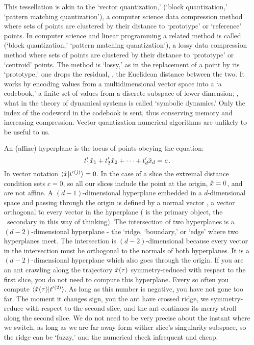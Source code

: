 \begin{description}
 This tessellation is akin to the
{`vector quantization,'} (`block quantization,'  `pattern matching quantization'),
a computer science data compression method where sets of points are
clustered by their distance to `prototype' or `reference' points.
In computer science and linear programming a related method
is called 
(`block quantization,' `pattern matching
quantization'), a lossy data compression method where sets of points are
clustered by their distance to `prototype' or `centroid' points.
The
method is `lossy,' as in the replacement of a point by its `prototype,'
one drops the residual, \ie, the Euclidean distance between the two. It
works by encoding values from a multidimensional vector space into a `a
codebook,' a finite set of values from a discrete subspace of lower
dimension; \ie, what in the theory of dynamical systems is called
`symbolic dynamics.' Only the index of the codeword in the codebook is sent, thus
conserving memory and increasing compression. Vector quantization
numerical algorithms are unlikely to be useful to us.

An (affine) hyperplane is the locus of points obeying the equation:
\[
t'_{1}\hat{x}_1 + t'_{2}\hat{x}_2 + \cdots + t'_{d}\hat{x}_d = c
\,.
\]
In vector notation $\braket{\sspRed}{\sliceTan{}{}^{(j)}}=0$. In the case
of a slice the extremal distance condition sets $c=0$, so all our slices
include the point at the origin, $\hat{x}=0$, and are not affine. A
$(d\!-\!1)$-dimensional hyperplane embedded in a $d$-dimensional space
and passing through the origin is defined by a normal vector \sliceTan{},
a vector orthogonal to every vector in the hyperplane (\sliceTan{} is the
primary object, the {\template} \slicep\ secondary in this way of thinking).
The intersection of two hyperplanes is a $(d\!-\!2)$-dimensional
hyperplane - the `ridge, `boundary,' or `edge' where two hyperplanes
meet. The intersection is $(d\!-\!2)$-dimensional because every vector in
the intersection must be orthogonal to the normals of both hyperplanes.
It is a $(d\!-\!2)$-dimensional hyperplane which also goes through the
origin. If you are an ant crawling along the trajectory $\hat{x}(\tau)$
symmetry-reduced with respect to the first slice, you do not need to
compute this hyperplane. Every so often you compute
$\braket{\sspRed(\tau)}{\sliceTan{}{}^{(2)}}$. As long as this number is
negative, you have not gone too far. The moment it changes sign, you the
ant have crossed ridge, we symmetry-reduce with respect to the second
slice, and the ant continues its merry stroll along the second slice. We
do not need to be very precise about the instant where we switch, as long
as we are far away form wither slice's singularity subspace, so the ridge
can be `fuzzy,' and the numerical check infrequent and cheap.


\end{description}
